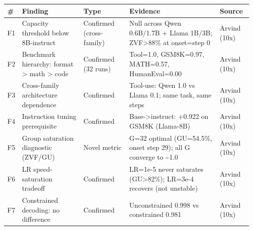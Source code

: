 \documentclass[
  american,
  11pt,
  a4paper,
  oneside]{report}
\newcounter{none} %
\begin{document}
{\def\LTcaptype{none} %
\begin{longtable}[]{@{}
  >{\raggedright\arraybackslash}p{}
  >{\raggedright\arraybackslash}p{}
  >{\raggedright\arraybackslash}p{}
  >{\raggedright\arraybackslash}p{}
  >{\raggedright\arraybackslash}p{}@{}}
\toprule\noalign{}
\begin{minipage}[b]{\linewidth}\raggedright
\#
\end{minipage} & \begin{minipage}[b]{\linewidth}\raggedright
Finding
\end{minipage} & \begin{minipage}[b]{\linewidth}\raggedright
Type
\end{minipage} & \begin{minipage}[b]{\linewidth}\raggedright
Evidence
\end{minipage} & \begin{minipage}[b]{\linewidth}\raggedright
Source
\end{minipage} \\
\midrule\noalign{}
\endhead
\bottomrule\noalign{}
\endlastfoot
F1 & Capacity threshold below 8B-instruct & Confirmed (cross-family) &
Null across Qwen 0.6B/1.7B + Llama 1B/3B; ZVF\textgreater88\% at
onset=step 0 & Arvind (10x) \\
F2 & Benchmark hierarchy: format \textgreater{} math \textgreater{} code
& Confirmed (32 runs) & Tool=1.0, GSM8K=0.97, MATH=0.57, HumanEval=0.00
& Arvind (10x) \\
F3 & Cross-family architecture dependence & Confirmed & Tool-use: Qwen
1.0 vs Llama 0.1; same task, same steps & Arvind (10x) \\
F4 & Instruction tuning prerequisite & Confirmed &
Base-\textgreater instruct: +0.922 on GSM8K (Llama-8B) & Arvind (10x) \\
F5 & Group saturation diagnostic (ZVF/GU) & Novel metric & G=32 optimal
(GU=54.5\%, onset step 29); all G converge to \textasciitilde1.0 &
Arvind (10x) \\
F6 & LR speed-saturation tradeoff & Confirmed & LR=1e-5 never saturates
(GU\textgreater82\%); LR=3e-4 recovers (not unstable) & Arvind (10x) \\
F7 & Constrained decoding: no difference & Confirmed & Unconstrained
0.998 vs constrained 0.981 & Arvind (10x) \\

\end{longtable}}
\end{document}

